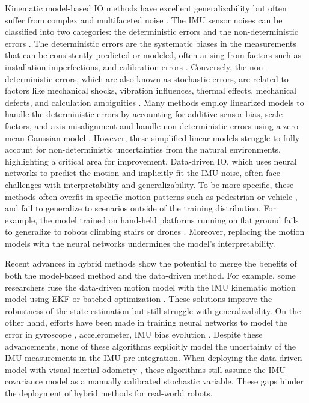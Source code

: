 Kinematic model-based IO methods have excellent generalizability but often suffer from complex and multifaceted noise \cite{barshan1995inertial}.
The IMU sensor noises can be classified into two categories: the deterministic errors and the non-deterministic errors \cite{rehder2016extending}.
The deterministic errors are the systematic biases in the measurements that can be consistently predicted or modeled, often arising from factors such as installation imperfections, and calibration errors \cite{li2022calib}.
Conversely, the non-deterministic errors, which are also known as stochastic errors, are related to factors like mechanical shocks, vibration influences, thermal effects, mechanical defects, and calculation ambiguities \cite{jao2023prio, capriglione2020experimental, li2014online}.
Many methods employ linearized models to handle the deterministic errors by accounting for additive sensor bias, scale factors, and axis misalignment \cite{tedaldi2014robust, furgale2013unified, Krebs2012} and handle non-deterministic errors using a zero-mean Gaussian model \cite{qin2018vins, rehder2016extending}.
However, these simplified linear models struggle to fully account for non-deterministic uncertainties from the natural environments, highlighting a critical area for improvement.
Data-driven IO, which uses neural networks to predict the motion and implicitly fit the IMU noise, often face challenges with interpretability and generalizability.
To be more specific, these methods often overfit in specific motion patterns such as pedestrian \cite{herath2020ronin} or vehicle \cite{brossard2020ai}, and fail to generalize to scenarios outside of the training distribution.
For example, the model trained on hand-held platforms running on flat ground fails to generalize to robots climbing stairs or drones \cite{buchanan2022deep}.
Moreover, replacing the motion models with the neural networks undermines the model's interpretability.

Recent advances in hybrid methods show the potential to merge the benefits of both the model-based method and the data-driven method. 
For example, some researchers fuse the data-driven motion model with the IMU kinematic motion model using EKF \cite{liu2020tlio, sun2021idol} or batched optimization \cite{buchanan2022learning}.
These solutions improve the robustness of the state estimation but still struggle with generalizability.
On the other hand, efforts have been made in training neural networks to model the error in gyroscope \cite{brossard2020ai}, accelerometer\cite{zhang2021imu}, IMU bias evolution \cite{buchanan2022deep}.
Despite these advancements, none of these algorithms explicitly model the uncertainty of the IMU measurements in the IMU pre-integration.
When deploying the data-driven model with visual-inertial odometry \cite{zhang2021imu, buchanan2022deep}, these algorithms still assume the IMU covariance model as a manually calibrated stochastic variable.
These gaps hinder the deployment of hybrid methods for real-world robots.

